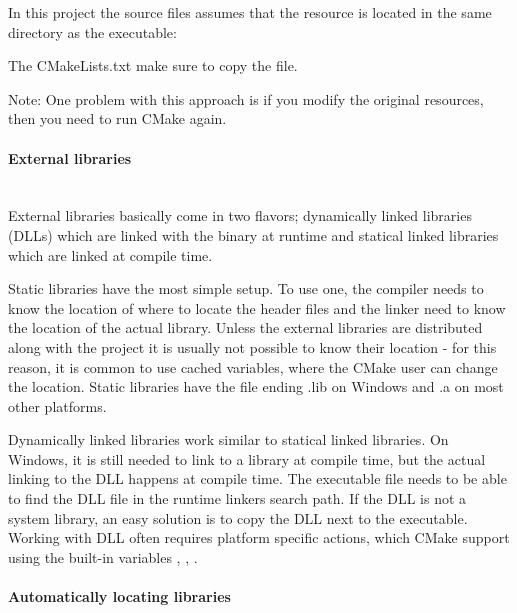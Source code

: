 \documentclass[11pt,a4paper,landscape]{scrartcl} %
\newcommand{\sectiontitle}[1]{\paragraph{#1} \ \\} %
\begin{document}
\begin{multicols}{2}
\vspace{\baselineskip} %
\noindent{}

In this project the source files assumes that the resource is located in the same directory as the executable:



The CMakeLists.txt make sure to copy the file. 



Note: One problem with this approach is if you modify the original resources, then you need to run CMake again.

\sectiontitle{External libraries}

External libraries basically come in two flavors; dynamically linked libraries (DLLs) which are linked with the binary at runtime and statical linked libraries which are linked at compile time.

Static libraries have the most simple setup. To use one, the compiler needs to know the location of where to locate the header files and the linker need to know the location of the actual library. Unless the external libraries are distributed along with the project it is usually not possible to know their location - for this reason, it is common to use cached variables, where the CMake user can change the location. Static libraries have the file ending .lib on Windows and .a on most other platforms. 



Dynamically linked libraries work similar to statical linked libraries. On Windows, it is still needed to link to a library at compile time, but the actual linking to the DLL happens at compile time. The executable file needs to be able to find the DLL file in the runtime linkers  search path. If the DLL is not a system library, an easy solution is to copy the DLL next to the executable. Working with DLL often requires platform specific actions, which CMake support using the built-in variables , , . 



\sectiontitle{Automatically locating libraries}


\end{multicols}
\end{document}
